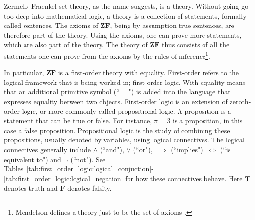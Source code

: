 \documentclass[../main.tex]{subfiles}
\begin{document}
\setcounter{section}{1}
Zermelo–Fraenkel set theory, as the name suggests, is a theory. Without going go too deep into mathematical logic, a theory is a collection of statements, formally called sentences. The axioms of $\mathbf{ZF}$, being by assumption true sentences, are therefore part of the theory. Using the axioms, one can prove more statements, which are also part of the theory. The theory of $\mathbf{ZF}$ thus consists of all the statements one can prove from the axioms by the rules of inference\footnote{Mendelson defines a theory just to be the set of axioms \cite{Mendelson1997}.}.

In particular, $\mathbf{ZF}$ is a first-order theory with equality. First-order refers to the logical framework that is being worked in; first-order logic. With equality means that an additional primitive symbol (``$=$") is added into the language that expresses equality between two objects. First-order logic is an extension of zeroth-order logic, or more commonly called propositional logic. A proposition is a statement that can be true or false. For instance, $\pi=3$ is a proposition, in this case a false proposition. Propositional logic is the study of combining these propositions, usually denoted by variables, using logical connectives. The logical connectives generally include $\land$ (``and"), $\lor$ (``or"), $\implies$ (``implies"), $\iff$ (``is equivalent to") and $\lnot$ (``not"). See Tables~\ref{tab:first_order_logic:logical_conjuction}\nobreakdash-\ref{tab:first_order_logic:logical_negation} for how these connectives behave. Here $\mathbf{T}$ denotes truth and $\mathbf{F}$ denotes falsity.
\end{document}
